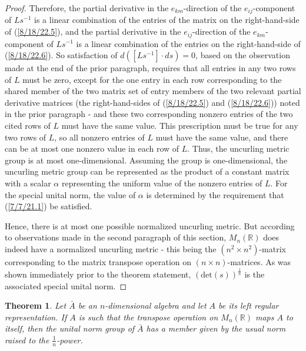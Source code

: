 \documentclass{amsart}
\numberwithin{equation}{section}
\newtheorem{theorem}{Theorem}
\theoremstyle{definition}
\numberwithin{theorem}{section}
\begin{document}
\begin{proof}
Therefore, the partial derivative in the $e_{km}$-direction of the $e_{ij}$-component of $Ls^{-1}$ is a linear combination of the entries of the matrix on the right-hand-side of (\ref{8/18/22.5}), and  the partial derivative in the $e_{ij}$-direction of the $e_{km}$-component of $Ls^{-1}$ is a linear combination of the entries on the right-hand-side of (\ref{8/18/22.6}).
So satisfaction of $d\left([Ls^{-1}]\cdot ds\right) = 0$, based on the observation made at the end of the prior paragraph, requires that all entries in any two rows of $L$ must be zero, except for the one entry in each row corresponding to the shared member of the two matrix set of entry members of the two relevant partial derivative matrices (the right-hand-sides of (\ref{8/18/22.5}) and (\ref{8/18/22.6})) noted in the prior paragraph - and these two corresponding nonzero entries of the two cited rows of $L$ must have the same value.  This prescription must be true for any two rows of $L$, so all nonzero entries of $L$ must have the same value, and there can be at most one nonzero value in each row of $L$.  Thus, the uncurling metric group is at most one-dimensional. Assuming the group is one-dimensional, the uncurling metric group can be represented as the product of a constant matrix with a scalar $\alpha$ representing the uniform value of the nonzero entries of $L$.  
For the special unital norm, the value of $\alpha$ is determined by the requirement that (\ref{7/7/21.1}) be satisfied. 

Hence, there is at most one possible normalized uncurling metric.  But according to observations made in the second paragraph of this section, $ M_n(\mathbb{R})$ does indeed have a normalized uncurling metric - this being the $(n^2\times n^2)$-matrix corresponding to the matrix transpose operation on $(n\times n)$-matrices.  As was shown immediately prior to the theorem statement, $(\mbox{det}(s))^{\frac{1}{n}}$ is the associated special unital norm.  
 \end{proof}
 
 \begin{theorem}\label{5/13/22.1} Let $\bar{A}$ be an $n$-dimensional algebra and let $A$ be its left regular representation.  If $A$ is such that the transpose operation on $ M_n(\mathbb{R})$ maps $A$ to itself, then the unital norm group of $\bar{A}$ has a member given by the usual norm raised to the $\frac{1}{n}$-power.   
\end{theorem}
\end{document}
